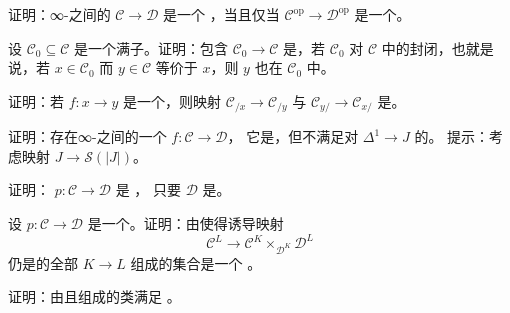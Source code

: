 \begin{exercise}\label{ex:isofibration-op}
证明：∞-\trCategories{}之间的\trFunctor{} $\mathcal{C} \to \mathcal{D}$ 是一个%
\trIsofibration{}，当且仅当 $\mathcal{C}^{\mathrm{op}} \to \mathcal{D}^{\mathrm{op}}$
是一个\trIsofibration{}。
\end{exercise}

\begin{exercise}\label{ex:full-subcat-isofibration}
设 $\mathcal{C}_0 \subseteq \mathcal{C}$ 是一个满子\trCategory{}。证明：包含
$\mathcal{C}_0 \to \mathcal{C}$ 是\trIsofibration{}，若 $\mathcal{C}_0$ 对
$\mathcal{C}$ 中的\trEquivalence{}封闭，也就是说，若 $x \in \mathcal{C}_0$ 而
$y \in \mathcal{C}$ 等价于 $x$，则 $y$ 也在 $\mathcal{C}_0$ 中。
\end{exercise}

\begin{exercise}\label{ex:slice-joyal-equivalence}
证明：若 $f\colon x \to y$ 是一个\trEquivalence{}，则映射
$\mathcal{C}_{/x} \to \mathcal{C}_{/y}$ 与 $\mathcal{C}_{y/} \to \mathcal{C}_{x/}$
是\trJoyalEquivalence{}。
\end{exercise}

\begin{exercise}\label{ex:conservative-not-rlp}
证明：存在∞-\trCategories{}之间的一个\trFunctor{} $f\colon \mathcal{C} \to \mathcal{D}$，
它是\trConservative{}，但不满足对 $\Delta^1 \to J$ 的\trRightLiftingProperty{}。
提示：考虑映射 $J \to \mathcal{S}(|J|)$。
\end{exercise}

\begin{exercise}\label{ex:left-fibration-kan}
证明：\trLeftFibration{} $p\colon \mathcal{C} \to \mathcal{D}$ 是 \trKanFibration{}，
只要 $\mathcal{D}$ 是\trInfinityGroupoid{}。
\end{exercise}

\begin{exercise}\label{ex:isofibration-saturated}
设 $p\colon \mathcal{C} \to \mathcal{D}$ 是一个\trIsofibration{}。证明：由使得诱导映射
\[
\mathcal{C}^{L} \to \mathcal{C}^{K} \times_{\mathcal{D}^{K}} \mathcal{D}^{L}
\]
仍是\trIsofibration{}的全部\trMonomorphism{} $K \to L$ 组成的集合是一个%
\trSaturatedSet。
\end{exercise}

\begin{exercise}\label{ex:three-for-two}
证明：由\trEssentiallySurjective{}且\trFullyFaithful{}\trFunctor{}组成的类满足%
\trThreeForTwoProperty{}。
\end{exercise}

